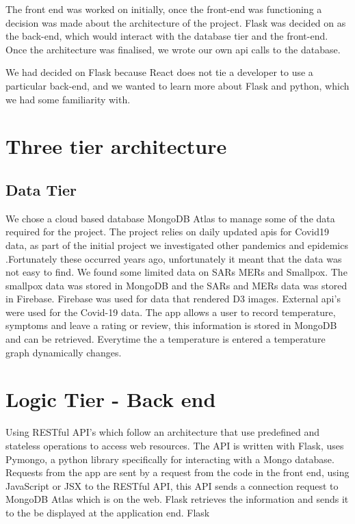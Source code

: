 The front end was worked on initially, once the front-end was functioning a decision was made about the architecture of the project. Flask was decided on as the back-end, which would interact with the database tier and the front-end.
Once the architecture was finalised, we wrote our own api calls to the database.
 
We had decided on Flask because React does not tie a developer to use a particular back-end, and we wanted to learn more about Flask and python, which we had some familiarity with.



\section{Three tier architecture}
\subsection{Data Tier}
We chose a cloud based database MongoDB Atlas to manage some of the data required for the project. The project relies on daily updated apis for Covid19 data, as part of the initial project we investigated other pandemics and epidemics .Fortunately these occurred years ago, unfortunately it meant that the data was not easy to find. We found some limited data on SARs MERs and Smallpox. The smallpox data was stored in MongoDB and the SARs and MERs data was stored in Firebase.
Firebase was used for data that rendered D3 images. External api's were used for the Covid-19 data. The app allows a user to record temperature, symptoms and leave a rating or review, this information is stored in MongoDB and can be retrieved. Everytime the a temperature is entered a temperature graph dynamically changes.

\section{Logic Tier - Back end}
Using RESTful API's which follow an architecture that use predefined and stateless operations to access web resources.
The API is written with Flask, uses Pymongo, a python library specifically for interacting with a Mongo database.
Requests from the app are sent by a request from the code in the front end, using JavaScript or JSX to the RESTful API, this API sends a connection request to MongoDB Atlas which is on the web. Flask retrieves the information and sends it to the be displayed at the application end.
Flask

